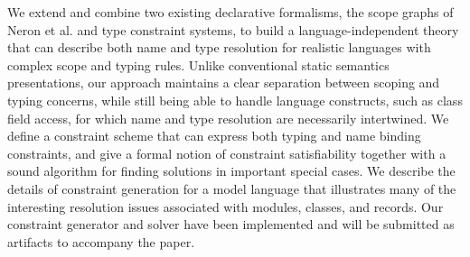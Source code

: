 We extend and combine two existing declarative formalisms, the scope graphs of Neron et al.
and type constraint systems, to build a language-independent theory that can
describe both name and type resolution for realistic languages with complex 
scope and typing rules. Unlike conventional static semantics presentations, our
approach maintains a clear separation between scoping and typing concerns, 
while still being able to handle language constructs, such as class 
field access, for which name and type resolution are necessarily intertwined.
We define a constraint scheme that can express both typing 
and name binding constraints, and give a formal notion of constraint satisfiability
together with a sound algorithm for finding solutions in important special cases.
We describe the details of constraint generation for a model language that
illustrates many of the interesting resolution issues associated with modules,
classes, and records. Our constraint generator and solver have been implemented and 
will be submitted as artifacts to accompany the paper.


